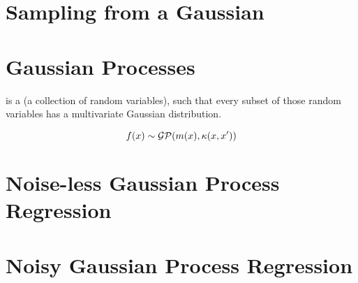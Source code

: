 \section{Sampling from a Gaussian}

\section{Gaussian Processes}

 is a  (a collection of random variables), such that every subset of those random variables has a multivariate Gaussian distribution.

\begin{equation}
f(x) \sim {\mathcal{G}} {\mathcal{P}} (m(x), \kappa(x, x'))
\end{equation} 


\section{Noise-less Gaussian Process Regression}

\section{Noisy Gaussian Process Regression}
